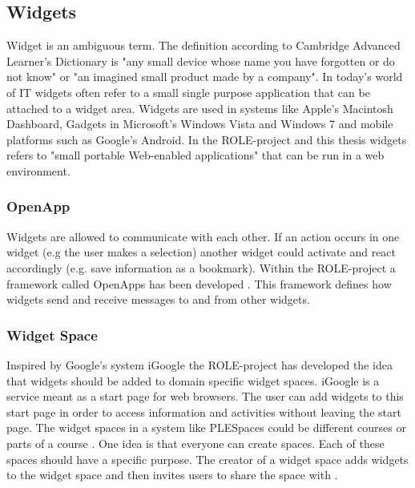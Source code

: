 \subsection {Widgets}
Widget is an ambiguous term. The definition according to Cambridge Advanced Learner's Dictionary is  "any small device whose name you have forgotten or do not know" or "an imagined small product made by a company".
In today's world of IT widgets often refer to a small single purpose application that can be attached to a widget area. Widgets are used in systems like Apple's Macintosh Dashboard, Gadgets in Microsoft's Windows Vista and Windows 7 and mobile platforms such as Google's Android. In the ROLE-project and this thesis widgets refers to "small portable Web-enabled applications" that can be run in a web environment. \cite{kiefel}

\subsubsection {OpenApp}
Widgets are allowed to communicate with each other. If an action occurs in one widget (e.g the user makes a selection) another widget could activate and react accordingly (e.g. save information as a bookmark). Within the ROLE-project a framework called OpenApps has been developed \cite{isaksson}. This framework defines how widgets send and receive messages to and from other widgets.

\subsubsection {Widget Space}
Inspired by Google's system iGoogle the ROLE-project has developed the idea that widgets should be added to domain specific widget spaces. iGoogle is a service meant as a start page for web browsers. The user can add widgets to this start page in order to access information and activities without leaving the start page. \cite{igoogle} The widget spaces in a system like PLESpaces could be different courses or parts of a course \cite{palmer}. One idea is that everyone can create spaces. Each of these spaces should have a specific purpose. The creator of a widget space adds widgets to the widget space and then invites users to share the space with \cite {kiefel}.

